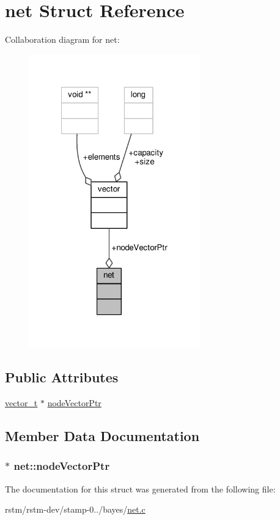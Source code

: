 \hypertarget{structnet}{\section{net Struct Reference}
\label{structnet}
}


Collaboration diagram for net\-:
\nopagebreak
\begin{figure}[H]
\begin{center}
\leavevmode
\includegraphics[width=210pt]{structnet__coll__graph}
\end{center}
\end{figure}
\subsection*{Public Attributes}
\begin{DoxyCompactItemize}
\item 
\hyperlink{vector_8h_a5a1bca6fa9a3f18a2897623094d918da}{vector\-\_\-t} $\ast$ \hyperlink{structnet_a436b81d3d63abdb876741e14cf457c9a}{node\-Vector\-Ptr}
\end{DoxyCompactItemize}


\subsection{Member Data Documentation}
\hypertarget{structnet_a436b81d3d63abdb876741e14cf457c9a}{
\subsubsection[{node\-Vector\-Ptr}]{$\ast$ net\-::node\-Vector\-Ptr}}\label{structnet_a436b81d3d63abdb876741e14cf457c9a}


The documentation for this struct was generated from the following file\-:\begin{DoxyCompactItemize}
\item 
rstm/rstm-\/dev/stamp-\/0../bayes/\hyperlink{net_8c}{net.\-c}\end{DoxyCompactItemize}

